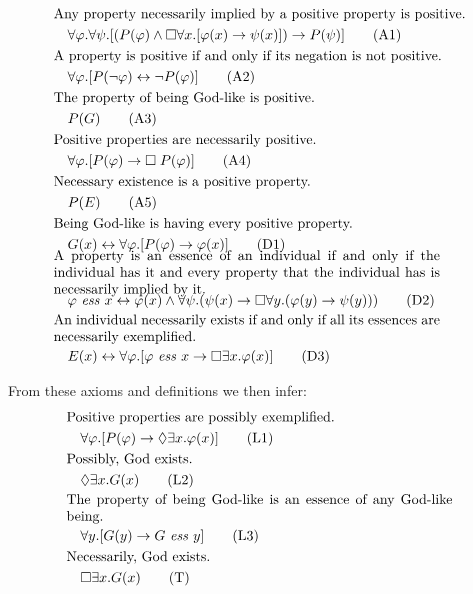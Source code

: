 \documentclass{llncs}
\newcommand{\imp}{\rightarrow}
\newcommand{\biimp}{\leftrightarrow}
\newcommand{\all}{\forall}
\newcommand{\ex}{\exists}
\newcommand{\nec}{\Box} %
\newcommand{\pos}{\Diamond} %
\newcommand{\ess}[2]{#1 \ \mathit{ess} \ #2}
\begin{document}
\begin{align}
& \text{Any property necessarily implied by a positive property is positive.} \notag \\
& \quad 
\all \varphi. \all \psi.[(P(\varphi) \wedge \nec \all x.[\varphi(x) \imp \psi(x)]) \imp P(\psi)] \tag{A1} \\
& \text{A property is positive if and only if its negation is not positive.} \notag \\
& \quad 
\all \varphi. [P(\neg \varphi) \biimp \neg P(\varphi)]
\tag{A2} \\
& \text{The property of being God-like is positive.} \notag \\
& \quad 
P(G) 
\tag{A3} \\
& \text{Positive properties are necessarily positive.} \notag \\
& \quad 
\all \varphi.[P(\varphi) \to \Box \; P(\varphi)]
\tag{A4} \\
& \text{Necessary existence is a positive property.} \notag \\
& \quad 
P(E)
\tag{A5} \\
& \text{Being God-like is having every positive property.} \notag \\
& \quad 
G(x) \biimp \forall \varphi. [P(\varphi) \to \varphi(x)]
\tag{D1} \\ 
& \parbox[c][2em][c]{0.8\textwidth}{A property is an essence of an individual if and only if the individual has it and every property  that the individual has is necessarily implied by it.}\notag \\
& \quad 
\ess{\varphi}{x} \biimp \varphi(x) \wedge \all \psi. (\psi(x) \imp \nec \all y. (\varphi(y) \imp \psi(y)))
\tag{D2} \\
& \parbox[c][2em][c]{0.8\textwidth}{An individual necessarily exists if and only if all its essences are necessarily exemplified.} \notag \\
& \quad 
E(x) \biimp \all \varphi.[\ess{\varphi}{x} \imp \nec \ex x.\varphi(x)] 
\tag{D3} 
\end{align}

\noindent
From these axioms and definitions we then infer:
\begin{align}
& \text{Positive properties are possibly exemplified.} \notag \\
& \quad 
\all \varphi. [P(\varphi) \imp \pos \ex x.\varphi(x)]
\tag{L1} \\
& \text{Possibly, God exists.} \notag \\
& \quad 
\pos \ex x. G(x)
\tag{L2} \\
& \parbox[c][2em][c]{0.8\textwidth}{The property of being God-like is an essence of any God-like being.} \notag \\
& \quad 
\all y.[G(y) \imp \ess{G}{y}]
\tag{L3} \\
& \text{Necessarily, God exists.} \notag \\
& \quad 
\nec \ex x. G(x)
\tag{T}
\end{align}
\end{document}
